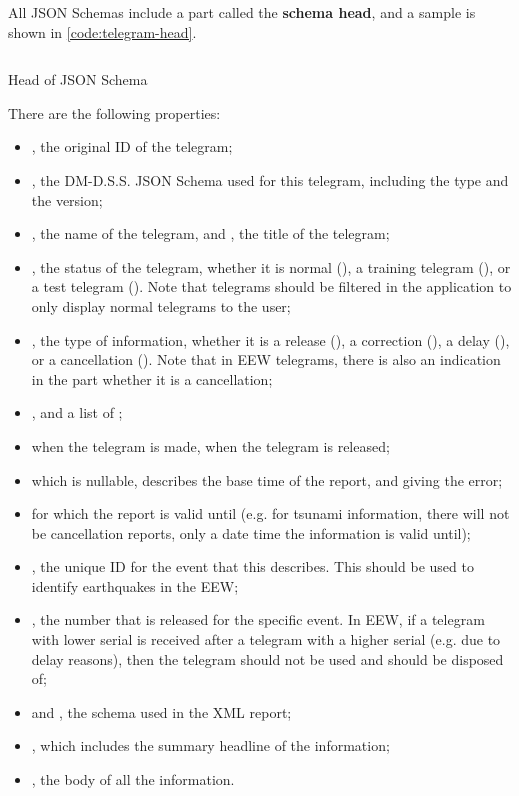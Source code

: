 All JSON Schemas include a part called the \textbf{schema head}, and a sample is shown in \autoref{code:telegram-head}.

\begin{listing}[htp]
    \inputminted{json}{code/TelegramHead.json}
    \caption{Head of JSON Schema}
    \label{code:telegram-head}
\end{listing}

There are the following properties:
\begin{itemize}
    \item {}, the original ID of the telegram;
    \item {}, the DM-D.S.S. JSON Schema used for this telegram, including the type and the version;
    \item {}, the name of the telegram, and , the title of the telegram;
    \item {}, the status of the telegram, whether it is normal (), a training telegram (), or a test telegram (). Note that telegrams should be filtered in the application to only display normal telegrams to the user;
    \item {}, the type of information, whether it is a release (), a correction (), a delay (), or a cancellation (). Note that in EEW telegrams, there is also an indication in the  part whether it is a cancellation;
    \item {}, and a list of ;
    \item {} when the telegram is made,  when the telegram is released;
    \item {} which is nullable, describes the base time of the report, and  giving the error;
    \item {} for which the report is valid until (e.g. for tsunami information, there will not be cancellation reports, only a date time the information is valid until);
    \item {}, the unique ID for the event that this describes. This should be used to identify earthquakes in the EEW;
    \item {}, the number that is released for the specific event. In EEW, if a telegram with lower serial is received after a telegram with a higher serial (e.g. due to delay reasons), then the telegram should not be used and should be disposed of;
    \item {} and , the schema used in the XML report;
    \item {}, which includes the summary headline of the information;
    \item {}, the body of all the information.
\end{itemize}

